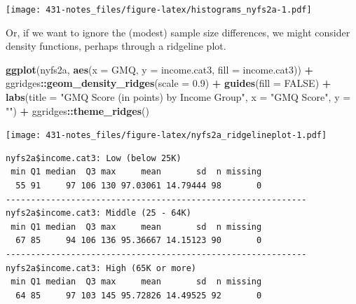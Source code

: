 \documentclass[
]{book}
\newenvironment{Shaded}{\begin{snugshade}}{\end{snugshade}}
\newcommand{\DataTypeTok}[1]{\textcolor[rgb]{0.13,0.29,0.53}{#1}}
\newcommand{\FloatTok}[1]{\textcolor[rgb]{0.00,0.00,0.81}{#1}}
\newcommand{\KeywordTok}[1]{\textcolor[rgb]{0.13,0.29,0.53}{\textbf{#1}}}
\newcommand{\NormalTok}[1]{#1}
\newcommand{\OperatorTok}[1]{\textcolor[rgb]{0.81,0.36,0.00}{\textbf{#1}}}
\newcommand{\OtherTok}[1]{\textcolor[rgb]{0.56,0.35,0.01}{#1}}
\newcommand{\StringTok}[1]{\textcolor[rgb]{0.31,0.60,0.02}{#1}}
\begin{document}
\texttt{[image: 431-notes\_files/figure-latex/histograms\_nyfs2a-1.pdf]}

Or, if we want to ignore the (modest) sample size differences, we might consider density functions, perhaps through a ridgeline plot.

\begin{Shaded}
\begin{Highlighting}[]
\KeywordTok{ggplot}\NormalTok{(nyfs2a, }\KeywordTok{aes}\NormalTok{(}\DataTypeTok{x =}\NormalTok{ GMQ, }\DataTypeTok{y =}\NormalTok{ income.cat3, }\DataTypeTok{fill =}\NormalTok{ income.cat3)) }\OperatorTok{+}
\StringTok{    }\NormalTok{ggridges}\OperatorTok{::}\KeywordTok{geom_density_ridges}\NormalTok{(}\DataTypeTok{scale =} \FloatTok{0.9}\NormalTok{) }\OperatorTok{+}
\StringTok{    }\KeywordTok{guides}\NormalTok{(}\DataTypeTok{fill =} \OtherTok{FALSE}\NormalTok{) }\OperatorTok{+}\StringTok{ }
\StringTok{    }\KeywordTok{labs}\NormalTok{(}\DataTypeTok{title =} \StringTok{"GMQ Score (in points) by Income Group"}\NormalTok{,}
         \DataTypeTok{x =} \StringTok{"GMQ Score"}\NormalTok{, }\DataTypeTok{y =} \StringTok{""}\NormalTok{) }\OperatorTok{+}
\StringTok{    }\NormalTok{ggridges}\OperatorTok{::}\KeywordTok{theme_ridges}\NormalTok{()}
\end{Highlighting}
\end{Shaded}

\texttt{[image: 431-notes\_files/figure-latex/nyfs2a\_ridgelineplot-1.pdf]}

\begin{Shaded}
\end{Shaded}

\begin{verbatim}
nyfs2a$income.cat3: Low (below 25K)
 min Q1 median  Q3 max     mean       sd  n missing
  55 91     97 106 130 97.03061 14.79444 98       0
------------------------------------------------------------ 
nyfs2a$income.cat3: Middle (25 - 64K)
 min Q1 median  Q3 max     mean       sd  n missing
  67 85     94 106 136 95.36667 14.15123 90       0
------------------------------------------------------------ 
nyfs2a$income.cat3: High (65K or more)
 min Q1 median  Q3 max     mean       sd  n missing
  64 85     97 103 145 95.72826 14.49525 92       0
\end{verbatim}
\end{document}
